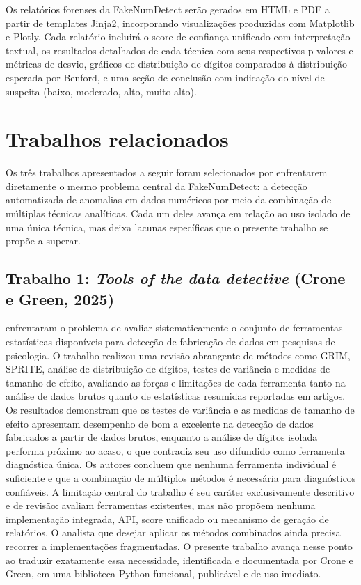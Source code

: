 \documentclass[
    12pt,                %
    openright,           %
    oneside,             %
    a4paper,             %
    english,             %
    brazil               %
]{abntex2}
\begin{document}
Os relatórios forenses da FakeNumDetect serão gerados em HTML e PDF a partir de templates Jinja2, 
incorporando visualizações produzidas com Matplotlib e Plotly. Cada relatório incluirá o score de 
confiança unificado com interpretação textual, os resultados detalhados de cada técnica com seus 
respectivos p-valores e métricas de desvio, gráficos de distribuição de dígitos comparados à distribuição 
esperada por Benford, e uma seção de conclusão com indicação do nível de suspeita (baixo, moderado, alto, muito alto).

\section{Trabalhos relacionados}
\label{sec:trabalhos_relacionados}

Os três trabalhos apresentados a seguir foram selecionados por enfrentarem diretamente o mesmo problema 
central da FakeNumDetect: a detecção automatizada de anomalias em dados numéricos por meio da combinação de 
múltiplas técnicas analíticas. Cada um deles avança em relação ao uso isolado de uma única técnica, mas deixa 
lacunas específicas que o presente trabalho se propõe a superar.

\subsection{Trabalho 1: \textit{Tools of the data detective} (Crone e Green, 2025)}

 enfrentaram o problema de avaliar sistematicamente o conjunto de ferramentas estatísticas disponíveis para detecção de fabricação de dados em pesquisas de psicologia. O trabalho realizou uma revisão abrangente de métodos como GRIM, SPRITE, análise de distribuição de dígitos, testes de variância e medidas de tamanho de efeito, avaliando as forças e limitações de cada ferramenta tanto na análise de dados brutos quanto de estatísticas resumidas reportadas em artigos.
Os resultados demonstram que os testes de variância e as medidas de tamanho de efeito apresentam desempenho de bom a excelente na detecção de dados fabricados a partir de dados brutos, enquanto a análise de dígitos isolada performa próximo ao acaso, o que contradiz seu uso difundido como ferramenta diagnóstica única. Os autores concluem que nenhuma ferramenta individual é suficiente e que a combinação de múltiplos métodos é necessária para diagnósticos confiáveis.
A limitação central do trabalho é seu caráter exclusivamente descritivo e de revisão:  avaliam ferramentas existentes, mas não propõem nenhuma implementação integrada, API, score unificado ou mecanismo de geração de relatórios. O analista que desejar aplicar os métodos combinados ainda precisa recorrer a implementações fragmentadas. O presente trabalho avança nesse ponto ao traduzir exatamente essa necessidade, identificada e documentada por Crone e Green, em uma biblioteca Python funcional, publicável e de uso imediato.
\end{document}
